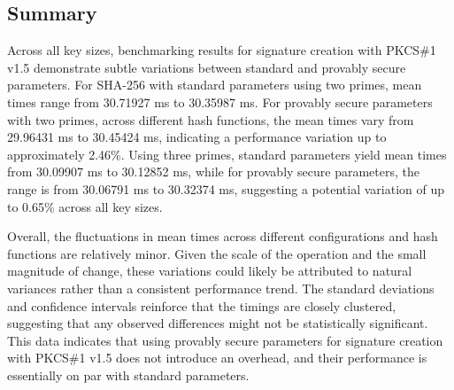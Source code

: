\documentclass[]{final_report}
\theoremstyle{definition}
\begin{document}

\subsection*{Summary}


Across all key sizes, benchmarking results for signature creation with PKCS\#1 v1.5 demonstrate subtle variations between standard and provably secure parameters. For SHA-256 with standard parameters using two primes, mean times range from 30.71927 ms to 30.35987 ms. For provably secure parameters with two primes, across different hash functions, the mean times vary from 29.96431 ms to 30.45424 ms, indicating a performance variation up to approximately 2.46\%. Using three primes, standard parameters yield mean times from 30.09907 ms to 30.12852 ms, while for provably secure parameters, the range is from 30.06791 ms to 30.32374 ms, suggesting a potential variation of up to 0.65\% across all key sizes. 

Overall, the fluctuations in mean times across different configurations and hash functions are relatively minor. Given the scale of the operation and the small magnitude of change, these variations could likely be attributed to natural variances rather than a consistent performance trend. The standard deviations and confidence intervals reinforce that the timings are closely clustered, suggesting that any observed differences might not be statistically significant. This data indicates that using provably secure parameters for signature creation with PKCS\#1 v1.5 does not introduce an overhead, and their performance is essentially on par with standard parameters.
\end{document}
